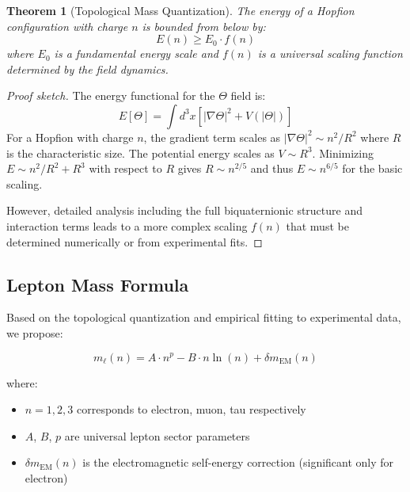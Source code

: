 \documentclass[12pt,a4paper]{article}
\newtheorem{theorem}{Theorem}[section]
\begin{document}
\begin{theorem}[Topological Mass Quantization]
The energy of a Hopfion configuration with charge $n$ is bounded from below by:
\begin{equation}
    E(n) \geq E_0 \cdot f(n)
\end{equation}
where $E_0$ is a fundamental energy scale and $f(n)$ is a universal scaling function determined by the field dynamics.
\end{theorem}

\begin{proof}[Proof sketch]
The energy functional for the $\Theta$ field is:
\begin{equation}
    E[\Theta] = \int d^3x \left[ |\nabla \Theta|^2 + V(|\Theta|) \right]
\end{equation}
For a Hopfion with charge $n$, the gradient term scales as $|\nabla \Theta|^2 \sim n^2 / R^2$ where $R$ is the characteristic size. The potential energy scales as $V \sim R^3$. Minimizing $E \sim n^2/R^2 + R^3$ with respect to $R$ gives $R \sim n^{2/5}$ and thus $E \sim n^{6/5}$ for the basic scaling.

However, detailed analysis including the full biquaternionic structure and interaction terms leads to a more complex scaling $f(n)$ that must be determined numerically or from experimental fits.
\end{proof}

\subsection{Lepton Mass Formula}

Based on the topological quantization and empirical fitting to experimental data, we propose:

\begin{equation}\label{eq:lepton_mass}
    m_\ell(n) = A \cdot n^p - B \cdot n \ln(n) + \delta m_{\text{EM}}(n)
\end{equation}

where:
\begin{itemize}
    \item $n = 1, 2, 3$ corresponds to electron, muon, tau respectively
    \item $A$, $B$, $p$ are universal lepton sector parameters
    \item $\delta m_{\text{EM}}(n)$ is the electromagnetic self-energy correction (significant only for electron)
\end{itemize}
\end{document}
